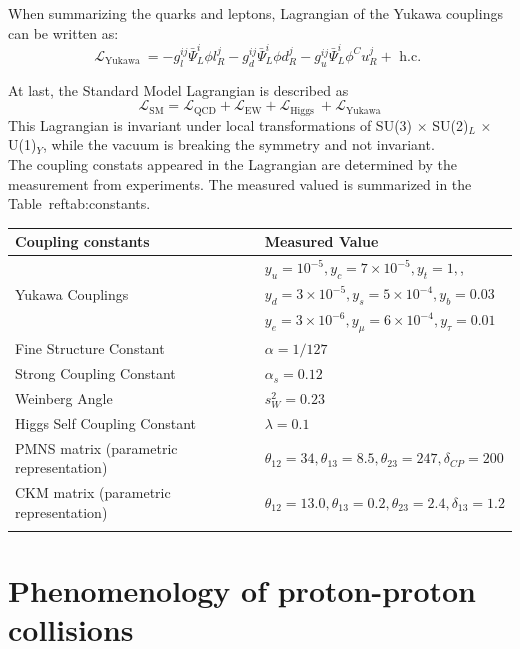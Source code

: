 When summarizing the quarks and leptons, Lagrangian of the Yukawa couplings can be written as:
\begin{equation}
\mathcal{L}_{\text {Yukawa }}=-g_{l}^{i j} \bar{\Psi}_{L}^{i} \phi l_{R}^{j}-g_{d}^{i j} \bar{\Psi}_{L}^{i} \phi d_{R}^{j}-g_{u}^{i j} \bar{\Psi}_{L}^{i} \phi^{C} u_{R}^{j}+\text { h.c. }
\end{equation}

At last, the Standard Model Lagrangian is described as 
\begin{equation}
\mathcal{L}_{\mathrm{SM}}=\mathcal{L}_{\mathrm{QCD}}+\mathcal{L}_{\mathrm{EW}}+\mathcal{L}_{\text {Higgs }}+\mathcal{L}_{\text {Yukawa}}
\end{equation}
This Lagrangian is invariant under local transformations of SU(3) $\times$ SU(2)$_L$ $\times$ U(1)$_Y$, while the vacuum is breaking the symmetry and not invariant. \\

The coupling constats appeared in the Lagrangian are determined by the measurement from experiments. The measured valued is summarized in the Table~ref{tab:constants}.  

\begin{tabular}{|l|l|}
\hline Coupling constants & Measured Value \\
\hline & $y_{u}=10^{-5}, y_{c}=7 \times 10^{-5}, y_{t}=1,$, \\
Yukawa Couplings & $y_{d}=3 \times 10^{-5}, y_{s}=5 \times 10^{-4}, y_{b}=0.03$ \\
& $y_{e}=3 \times 10^{-6}, y_{\mu}=6 \times 10^{-4}, y_{\tau}=0.01$ \\
Fine Structure Constant & $\alpha=1 / 127$ \\
Strong Coupling Constant & $\alpha_{s}=0.12$ \\
Weinberg Angle & $s_{W}^{2}=0.23$ \\
Higgs Self Coupling Constant & $\lambda=0.1$ \\
PMNS matrix (parametric representation) & $\theta_{12}=34, \theta_{13}=8.5, \theta_{23}=247, \delta_{C P}=200$ \\
CKM matrix (parametric representation) & $\theta_{12}=13.0, \theta_{13}=0.2, \theta_{23}=2.4, \delta_{13}=1.2$ \\
\hline
\label{tab:constants}
\end{tabular}

\section{Phenomenology of proton-proton collisions}

